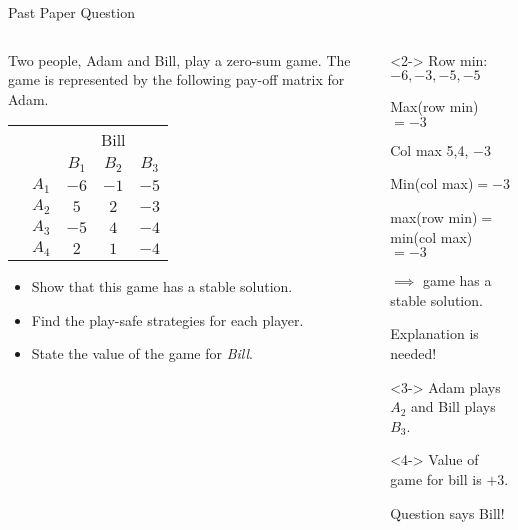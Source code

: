 \documentclass[8pt]{beamer}
\begin{document}
\begin{frame}{Past Paper Question}
	\begin{columns}[T]
		\begin{column}{.5\textwidth}
	\begin{problem}
		Two people, Adam and Bill, play a zero-sum game. The game is represented by the following pay-off matrix for Adam.
		
		\begin{center}
\colorbox{cc}{
	\setlength\arrayrulewidth{0.5mm}
\begin{tabular}{cc|ccc}
	\multicolumn{2}{c}{} & \multicolumn{3}{c}{Bill}\\
\multicolumn{1}{c}{} &  & $B_1$  & $B_2$ & $B_3$ \\ \hline
\raisebox{0.0cm}{\multirow{4}*{\rotatebox{90}{Adam}}}  & $A_1$ & $-6$ & $-1$ & $-5$ \\
& $A_2$ & $5$ & $2$ & $-3$ \\
& $A_3$ & $-5$ & $4$ & $-4$ \\
& $A_4$ & $2$ & $1$ & $-4$ \\
\end{tabular}}
\end{center}
\begin{itemize}
	\item Show that this game has a stable solution.
	\item Find the play-safe strategies for each player.
	\item State the value of the game for \emph{Bill}.
\end{itemize}
	\end{problem}
\end{column}
\begin{column}{.5\textwidth}
	\begin{solution}<2->
		Row min: $-6,-3,-5,-5$

		Max(row min)$= -3$

		Col max 5,4, $-3$

		Min(col max)$=-3$

		max(row min)$=$min(col max) $=-3$

		 $\implies$ game has a stable solution.

		 \alert<2>{Explanation is needed!}
	\end{solution}
	\begin{solution}<3->
		Adam plays $ A_2$ and Bill plays $ B_3$.
	\end{solution}
	\begin{solution}<4->
		Value of game for bill is $+3$.

		\alert<4>{Question says Bill!} 
	\end{solution}
\end{column}
\end{columns}
\end{frame}
\end{document}
